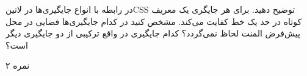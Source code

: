 \documentclass[../main.tex]{subfiles}
\begin{document}

در رابطه با انواع جایگیری‌ها در ‌لاتین{CSS} توضیح دهید. برای هر جایگری یک معریف کوتاه در حد یک خط کفایت می‌کند. مشخص کنید در کدام
جایگیری‌ها فضایی در محل پیش‌فرض المنت لحاظ نمی‌گردد؟ کدام جایگیری در واقع ترکیبی از دو جایگیری دیگر است؟

۲ نمره
\end{document}
